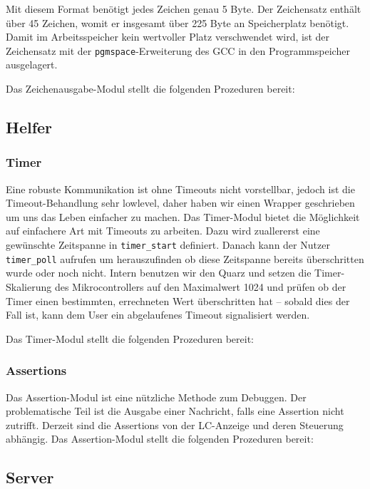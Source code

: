 \documentclass[ngerman]{article}
\begin{document}
Mit diesem Format benötigt jedes Zeichen genau 5 Byte. Der Zeichensatz enthält
über 45 Zeichen, womit er insgesamt über 225 Byte an Speicherplatz benötigt.
Damit im Arbeitsspeicher kein wertvoller Platz  verschwendet wird, ist der
Zeichensatz mit der {\tt pgmspace}-Erweiterung des GCC in den Programmspeicher
ausgelagert.

Das Zeichenausgabe-Modul stellt die folgenden Prozeduren bereit:




\subsection{Helfer}


\subsubsection{Timer}

Eine robuste Kommunikation ist ohne Timeouts nicht vorstellbar, jedoch ist die
Timeout-Behandlung sehr lowlevel, daher haben wir einen Wrapper geschrieben um
uns das Leben einfacher zu machen.  Das Timer-Modul bietet die Möglichkeit auf
einfachere Art mit Timeouts zu arbeiten. Dazu wird zuallererst eine gewünschte
Zeitspanne in \texttt{timer\_start} definiert. Danach kann der Nutzer
\texttt{timer\_poll} aufrufen um herauszufinden ob diese Zeitspanne bereits
überschritten wurde oder noch nicht. Intern benutzen wir den Quarz und setzen
die Timer-Skalierung des Mikrocontrollers auf den Maximalwert 1024 und prüfen
ob der Timer einen bestimmten, errechneten Wert überschritten hat -- sobald
dies der Fall ist, kann dem User ein abgelaufenes Timeout signalisiert werden.

Das Timer-Modul stellt die folgenden Prozeduren bereit:




\subsubsection{Assertions}

Das Assertion-Modul ist eine nützliche Methode zum Debuggen.  Der
problematische Teil ist die Ausgabe einer Nachricht, falls eine Assertion nicht
zutrifft. Derzeit sind die Assertions von der LC-Anzeige und deren Steuerung
abhängig. Das Assertion-Modul stellt die folgenden Prozeduren bereit:




\subsection{Server}
\end{document}
